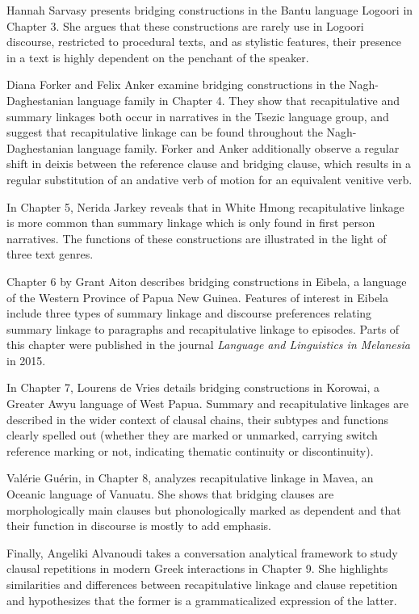 \begin{refsection}
Hannah Sarvasy presents bridging constructions in the Bantu language Logoori in Chapter 3. She argues that these constructions are rarely use in Logoori discourse, restricted to procedural texts, and as stylistic features, their presence in a text is highly dependent on the penchant of the speaker. 

Diana Forker and Felix Anker examine bridging constructions in the Nagh-Daghestanian language family in Chapter 4. They show that recapitulative and summary linkages both occur in narratives in the Tsezic language group, and suggest that recapitulative linkage can be found throughout the Nagh-Daghestanian language family. Forker and Anker additionally observe a regular shift in deixis between the reference clause and bridging clause, which results in a regular substitution of an andative verb of motion for an equivalent venitive verb. 

In Chapter 5, Nerida Jarkey reveals that in White Hmong recapitulative linkage is more common than summary linkage which is only found in first person narratives. The functions of these constructions are illustrated in the light of three text genres. 

Chapter 6 by Grant Aiton describes bridging constructions in Eibela, a language of the Western Province of Papua New Guinea. Features of interest in Eibela include three types of summary linkage and discourse preferences relating summary linkage to paragraphs and recapitulative linkage to episodes. Parts of this chapter were published in the journal \textit{Language and Linguistics in Melanesia} in 2015. 

In Chapter 7, Lourens de Vries details bridging constructions in Korowai, a Greater Awyu language of West Papua. Summary and recapitulative linkages are described in the wider context of clausal chains, their subtypes and functions clearly spelled out (whether they are marked or unmarked, carrying switch reference marking or not, indicating thematic continuity or discontinuity). 

Valérie Guérin, in Chapter 8, analyzes recapitulative linkage in Mavea, an Oceanic language of Vanuatu. She shows that bridging clauses are morphologically main clauses but phonologically marked as dependent and that their function in discourse is mostly to add emphasis. 

Finally, Angeliki Alvanoudi takes a conversation analytical framework to study clausal repetitions in modern Greek interactions in Chapter 9. She highlights similarities and differences between recapitulative linkage and clause repetition and hypothesizes that the former is a grammaticalized expression of the latter. 




\end{refsection}
